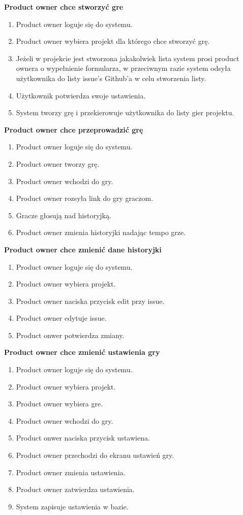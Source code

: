 \textbf{Product owner chce stworzyć gre}
\begin{enumerate}
    \item Product owner loguje się do systemu.
    \item Product owner wybiera projekt dla którego chce stworzyć grę.
    \item Jeżeli w projekcie jest stworzona jakakolwiek lista system prosi product ownera o wypełnienie formularza,
    w przeciwnym razie system odsyła użytkownika do listy issue's Github'a w celu stworzenia listy.
    \item Użytkownik potwierdza swoje ustawienia.
    \item System tworzy grę i przekierowuje użytkownika do listy gier projektu.
\end{enumerate}
\textbf{Product owner chce przeprowadzić grę}
\begin{enumerate}
    \item Product owner loguje się do systemu.
    \item Product owner tworzy grę.
    \item Product owner wchodzi do gry.
    \item Product owner rozsyła link do gry graczom.
    \item Gracze głosują nad historyjką.
    \item Product owner zmienia historyjki nadając tempo grze.
\end{enumerate}
\textbf{Product owner chce zmienić dane historyjki}
\begin{enumerate}
    \item Product owner loguje się do systemu.
    \item Product owner wybiera projekt.
    \item Product owner naciska przycisk edit przy issue.
    \item Product owner edytuje issue.
    \item Product onwer potwierdza zmiany.
\end{enumerate}
\textbf{Product owner chce zmienić ustawienia gry}
\begin{enumerate}
    \item Product owner loguje się do systemu.
    \item Product owner wybiera projekt.
    \item Product owner wybiera gre.
    \item Product owner wchodzi do gry.
    \item Product onwer naciska przycisk ustawiena.
    \item Product owner przechodzi do ekranu ustawień gry.
    \item Product owner zmienia ustawienia.
    \item Product owner zatwierdza ustawienia.
    \item System zapisuje ustawienia w bazie.
\end{enumerate}
